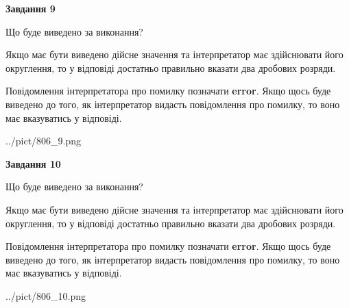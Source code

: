 \documentclass[12pt, ukrainian]{article}
\begin{document}
{\begin {Large}
{\begin {center}\textbf{Завдання 9}\end {center}}\par
Що буде виведено за виконання? \par

Якщо має бути виведено дійсне значення та інтерпретатор має здійснювати його округлення, 
то у відповіді достатньо правильно вказати два дробових розряди.

Повідомлення інтерпретатора про помилку позначати \textbf{error}.
Якщо щось буде виведено до того, як інтерпретатор видасть повідомлення про помилку, 
то воно має вказуватись у відповіді. \par

\begin{center}
	{../pict/806_9.png}
\end{center}
\newpage

{\begin {center}\textbf{Завдання 10}\end {center}}\par
Що буде виведено за виконання? \par

Якщо має бути виведено дійсне значення та інтерпретатор має здійснювати його округлення, 
то у відповіді достатньо правильно вказати два дробових розряди.

Повідомлення інтерпретатора про помилку позначати \textbf{error}.
Якщо щось буде виведено до того, як інтерпретатор видасть повідомлення про помилку, 
то воно має вказуватись у відповіді. \par

\begin{center}
	{../pict/806_10.png}
\end{center}
\newpage

\end {Large}}
\end{document}
